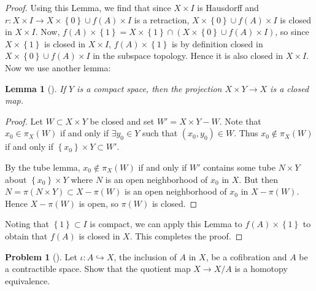 \documentclass[reqno]{amsart}
\newtheorem{lemma}[theorem]{Lemma}
\theoremstyle{definition}
\newtheorem{problem}[theorem]{Problem}
\theoremstyle{remark}
\begin{document}
\begin{proof}
    Using this Lemma, we find that since
    $X \times I$ is Hausdorff and
    $r \colon X \times I \to X \times \left\{ 0 \right\} 
    \cup f(A) \times I$ is a retraction,
    $X \times \left\{ 0 \right\} \cup 
    f(A) \times I$ is closed in
    $X \times I$.
    Now,
    $f(A) \times \left\{ 1 \right\} 
    = X \times \left\{ 1 \right\} 
    \cap \left( X \times \left\{ 0 \right\} \cup 
    f(A) \times I\right) $, so
    since $X \times \left\{ 1 \right\} $ is closed
    in $X \times I$,
    $f(A) \times \left\{ 1 \right\} $ 
    is by definition closed in 
    $X \times \left\{ 0 \right\} \cup 
    f(A) \times I$ in the subspace topology. Hence
    it is also closed in $X \times I$.
    Now we use another lemma:
    \begin{lemma}[]
        If $Y$ is a compact space, then
        the projection $X \times Y \to X$ is a closed map.
    \end{lemma}
    \begin{proof}
        Let $W \subset X \times Y$ be closed and
        set $W' = X \times Y -W$.
        Note that $x_0 \in \pi_X (W)$ if and only
        if $\exists y_0 \in Y$ such that
        $(x_0,y_0) \in W$. Thus
        $x_0 \not\in \pi_X(W)$ if and only if
        $\left\{ x_0 \right\} \times Y \subset 
        W'$.

        By the tube lemma,
        $x_0 \not\in \pi_X (W)$ if and only if
        $W'$ contains some tube
        $N \times Y$ about $\left\{ x_0 \right\} \times Y$ 
        where $N$ is an open neighborhood of $x_0$ in $X$. 
        But then
        $N = \pi(N \times Y) \subset 
        X - \pi(W)$ is an open neighborhood of $x_0$ in
        $X - \pi(W)$. Hence
        $X - \pi(W)$ is open, so $\pi(W)$ is
        closed.
    \end{proof}
    Noting that
    $\left\{ 1 \right\} \subset I$ is compact,
    we can apply this Lemma to
    $f(A) \times \left\{ 1 \right\} $ to obtain that
    $f(A)$ is closed in $X$.
    This completes the proof.

\end{proof}

\newpage
\begin{problem}[]
    Let $\iota \colon A \hookrightarrow X$,
    the inclusion of $A$ in $X$, be a cofibration and
    $A$ be a contractible space. Show that the
    quotient map $X \to X / A$ is a homotopy equivalence.
\end{problem}
\end{document}
